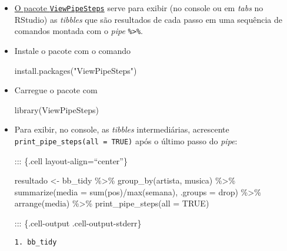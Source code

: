 \documentclass[
  letterpaper,
  DIV=11,
  numbers=noendperiod]{scrreprt}
\newenvironment{Shaded}{\begin{snugshade}}{\end{snugshade}}
\newcommand{\AttributeTok}[1]{\textcolor[rgb]{0.40,0.45,0.13}{#1}}
\newcommand{\ConstantTok}[1]{\textcolor[rgb]{0.56,0.35,0.01}{#1}}
\newcommand{\FunctionTok}[1]{\textcolor[rgb]{0.28,0.35,0.67}{#1}}
\newcommand{\NormalTok}[1]{\textcolor[rgb]{0.00,0.23,0.31}{#1}}
\newcommand{\OtherTok}[1]{\textcolor[rgb]{0.00,0.23,0.31}{#1}}
\newcommand{\SpecialCharTok}[1]{\textcolor[rgb]{0.37,0.37,0.37}{#1}}
\newcommand{\StringTok}[1]{\textcolor[rgb]{0.13,0.47,0.30}{#1}}
\begin{document}
\begin{itemize}
\item
  \href{https://github.com/daranzolin/ViewPipeSteps}{O pacote
  \texttt{ViewPipeSteps}} serve para exibir (no console ou em
  \emph{tabs} no RStudio) as \emph{tibbles} que são resultados de cada
  passo em uma sequência de comandos montada com o \emph{pipe}
  \texttt{\%\textgreater{}\%}.
\item
  Instale o pacote com o comando

\begin{Shaded}
\begin{Highlighting}[]
\FunctionTok{install.packages}\NormalTok{(}\StringTok{"ViewPipeSteps"}\NormalTok{)}
\end{Highlighting}
\end{Shaded}
\item
  Carregue o pacote com

\begin{Shaded}
\begin{Highlighting}[]
\FunctionTok{library}\NormalTok{(ViewPipeSteps)}
\end{Highlighting}
\end{Shaded}
\item
  Para exibir, no console, as \emph{tibbles} intermediárias, acrescente
  \texttt{print\_pipe\_steps(all\ =\ TRUE)} após o último passo do
  \emph{pipe}:

  ::: \{.cell layout-align=``center''\}

\begin{Shaded}
\begin{Highlighting}[]
\NormalTok{resultado }\OtherTok{\textless{}{-}}\NormalTok{ bb\_tidy }\SpecialCharTok{\%\textgreater{}\%} 
  \FunctionTok{group\_by}\NormalTok{(artista, musica) }\SpecialCharTok{\%\textgreater{}\%} 
  \FunctionTok{summarize}\NormalTok{(}\AttributeTok{media =} \FunctionTok{sum}\NormalTok{(pos)}\SpecialCharTok{/}\FunctionTok{max}\NormalTok{(semana), }\AttributeTok{.groups =} \StringTok{\textquotesingle{}drop\textquotesingle{}}\NormalTok{) }\SpecialCharTok{\%\textgreater{}\%} 
  \FunctionTok{arrange}\NormalTok{(media) }\SpecialCharTok{\%\textgreater{}\%} 
  \FunctionTok{print\_pipe\_steps}\NormalTok{(}\AttributeTok{all =} \ConstantTok{TRUE}\NormalTok{)}
\end{Highlighting}
\end{Shaded}

  ::: \{.cell-output .cell-output-stderr\}

\begin{verbatim}
1. bb_tidy
\end{verbatim}


\end{itemize}
\end{document}
